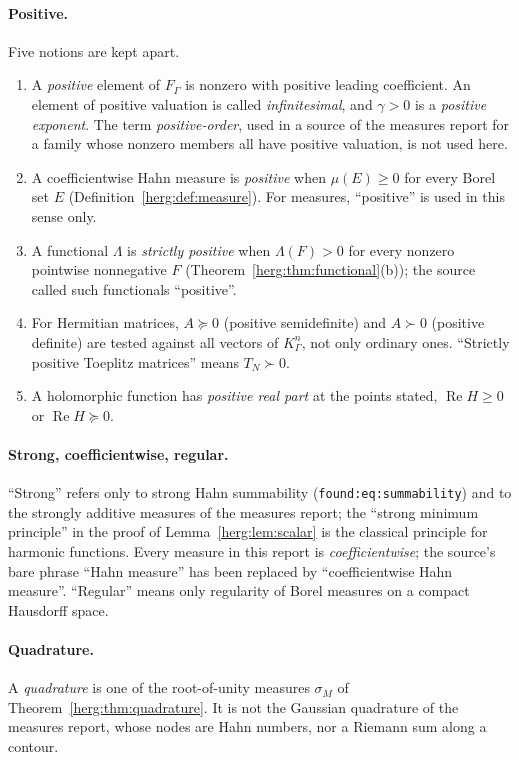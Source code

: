 \documentclass[11pt,letterpaper]{article}
\theoremstyle{definition}
\newcommand{\FG}{F_\Gamma}\newcommand{\KG}{K_\Gamma}
\newcommand{\Rea}{\operatorname{Re}}
\newcommand{\lbl}[1]{\nolinkurl{#1}}%
\numberwithin{equation}{section}
\begin{document}
\paragraph{Positive.}
Five notions are kept apart.
\begin{enumerate}[label=(\alph*)]
\item A \emph{positive} element of $\FG$ is nonzero with positive leading coefficient. An element of positive valuation is called \emph{infinitesimal}, and $\gamma>0$ is a \emph{positive exponent}. The term \emph{positive-order}, used in a source of the measures report for a family whose nonzero members all have positive valuation, is not used here.
\item A coefficientwise Hahn measure is \emph{positive} when $\mu(E)\ge0$ for every Borel set $E$ (Definition~\ref{herg:def:measure}). For measures, ``positive'' is used in this sense only.
\item A functional $\Lambda$ is \emph{strictly positive} when $\Lambda(F)>0$ for every nonzero pointwise nonnegative $F$ (Theorem~\ref{herg:thm:functional}(b)); the source called such functionals ``positive''.
\item For Hermitian matrices, $A\succeq0$ (positive semidefinite) and $A\succ0$ (positive definite) are tested against all vectors of $\KG^n$, not only ordinary ones. ``Strictly positive Toeplitz matrices'' means $T_N\succ0$.
\item A holomorphic function has \emph{positive real part} at the points stated, $\Rea H\ge0$ or $\Rea H\succeq0$.
\end{enumerate}

\paragraph{Strong, coefficientwise, regular.}
``Strong'' refers only to strong Hahn summability (\lbl{found:eq:summability}) and to the strongly additive measures of the measures report; the ``strong minimum principle'' in the proof of Lemma~\ref{herg:lem:scalar} is the classical principle for harmonic functions. Every measure in this report is \emph{coefficientwise}; the source's bare phrase ``Hahn measure'' has been replaced by ``coefficientwise Hahn measure''. ``Regular'' means only regularity of Borel measures on a compact Hausdorff space.

\paragraph{Quadrature.}
A \emph{quadrature} is one of the root-of-unity measures $\sigma_M$ of Theorem~\ref{herg:thm:quadrature}. It is not the Gaussian quadrature of the measures report, whose nodes are Hahn numbers, nor a Riemann sum along a contour.
\end{document}
